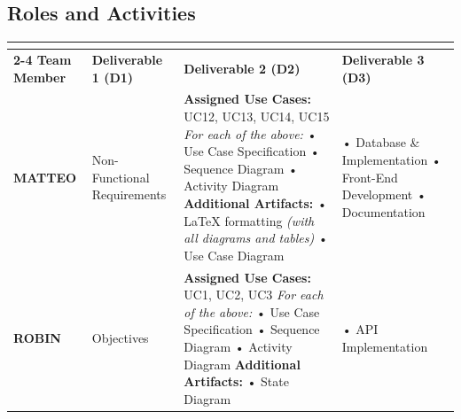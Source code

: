 \documentclass{article}
\begin{document}
\subsection{Roles and Activities}
\begin{table}[htbp]
\centering
\small
\begin{tabularx}{\textwidth}{@{} >{\bfseries}l >{\hsize=0.8\hsize}X >{\hsize=1.4\hsize}X >{\hsize=0.8\hsize}X @{}}
\toprule
 & \multicolumn{3}{c}{\textbf{Main Contributions}} \\
\cmidrule(l){2-4}
\textbf{Team Member} & \textbf{Deliverable 1 (D1)} & \textbf{Deliverable 2 (D2)} & \textbf{Deliverable 3 (D3)} \\
\midrule
MATTEO   & Non-Functional \newline Requirements & 
  \textbf{Assigned Use Cases:} \newline
  UC12, UC13, UC14, UC15 \newline
  \addlinespace[2pt]
  \textit{For each of the above:} \newline
  • Use Case Specification \newline
  • Sequence Diagram \newline
  • Activity Diagram \newline
   \textbf{Additional Artifacts:} \newline
  • LaTeX formatting \newline \textit{(with all diagrams and tables)}  \newline  
  • Use Case Diagram \newline
  & • Database \& Implementation  \newline
  • Front-End Development \newline
  • Documentation \\
\addlinespace
ROBIN    & Objectives                  & 
  \textbf{Assigned Use Cases:} \newline
  UC1, UC2, UC3 \newline
  \addlinespace[2pt]
  \textit{For each of the above:} \newline
  • Use Case Specification \newline
  • Sequence Diagram \newline
  • Activity Diagram \newline
  \addlinespace[4pt]
  \textbf{Additional Artifacts:} \newline
  • State Diagram & 
  • API Implementation \newline

\end{tabularx}
\end{table}
\end{document}
